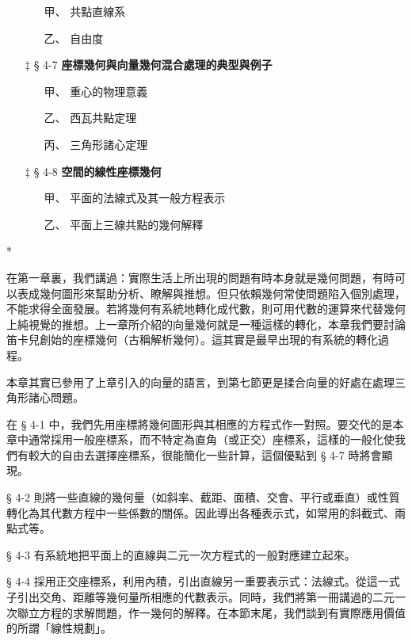 \begin{itemize}[leftmargin=2em]
\begin{itemize}[leftmargin=2em]
    \item[甲、] 共點直線系
    \item[乙、] 自由度
  \end{itemize}
  \item[$\ddagger$ § 4-7] \textbf{座標幾何與向量幾何混合處理的典型與例子}
  \begin{itemize}[leftmargin=2em]
    \item[甲、] 重心的物理意義
    \item[乙、] 西瓦共點定理
    \item[丙、] 三角形諸心定理
  \end{itemize}
  \item[$\ddagger$ § 4-8] \textbf{空間的線性座標幾何}
  \begin{itemize}[leftmargin=2em]
    \item[甲、] 平面的法線式及其一般方程表示
    \item[乙、] 平面上三線共點的幾何解釋
  \end{itemize}
\end{itemize}

\begin{center}
  * \qquad * \qquad *
\end{center}

在第一章裏，我們講過：實際生活上所出現的問題有時本身就是幾何問題，有時可以表成幾何圖形來幫助分析、瞭解與推想。但只依賴幾何常使問題陷入個別處理，不能求得全面發展。若將幾何有系統地轉化成代數，則可用代數的運算來代替幾何上純視覺的推想。上一章所介紹的向量幾何就是一種這樣的轉化，本章我們要討論笛卡兒創始的座標幾何（古稱解析幾何）。這其實是最早出現的有系統的轉化過程。

本章其實已參用了上章引入的向量的語言，到第七節更是揉合向量的好處在處理三角形諸心問題。

在 § 4-1 中，我們先用座標將幾何圖形與其相應的方程式作一對照。要交代的是本章中通常採用一般座標系，而不特定為直角（或正交）座標系，這樣的一般化使我們有較大的自由去選擇座標系，很能簡化一些計算，這個優點到 § 4-7 時將會顯現。

§ 4-2 則將一些直線的幾何量（如斜率、截距、面積、交會、平行或垂直）或性質轉化為其代數方程中一些係數的關係。因此導出各種表示式，如常用的斜截式、兩點式等。

§ 4-3 有系統地把平面上的直線與二元一次方程式的一般對應建立起來。

§ 4-4 採用正交座標系，利用內積，引出直線另一重要表示式：法線式。從這一式子引出交角、距離等幾何量所相應的代數表示。同時，我們將第一冊講過的二元一次聯立方程的求解問題，作一幾何的解釋。在本節末尾，我們談到有實際應用價值的所謂「線性規劃」。

